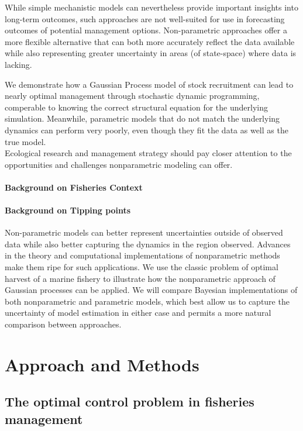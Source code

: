 \documentclass[author-year, review]{elsarticle} %
\begin{document}
While simple mechanistic models can nevertheless provide important
insights into long-term outcomes, such approaches are not well-suited
for use in forecasting outcomes of potential management options.
Non-parametric approaches offer a more flexible alternative that can
both more accurately reflect the data available while also representing
greater uncertainty in areas (of state-space) where data is lacking.

We demonstrate how a Gaussian Process model of stock recruitment can
lead to nearly optimal management through stochastic dynamic
programming, comperable to knowing the correct structural equation for
the underlying simulation. Meanwhile, parametric models that do not
match the underlying dynamics can perform very poorly, even though they
fit the data as well as the true model.\\Ecological research and
management strategy should pay closer attention to the opportunities and
challenges nonparametric modeling can offer.

\paragraph{Background on Fisheries Context}

\paragraph{Background on Tipping points}

Non-parametric models can better represent uncertainties outside of
observed data while also better capturing the dynamics in the region
observed. Advances in the theory and computational implementations of
nonparametric methods make them ripe for such applications. We use the
classic problem of optimal harvest of a marine fishery to illustrate how
the nonparametric approach of Gaussian processes can be applied. We will
compare Bayesian implementations of both nonparametric and parametric
models, which best allow us to capture the uncertainty of model
estimation in either case and permits a more natural comparison between
approaches.

\section{Approach and Methods}

\subsection{The optimal control problem in fisheries management}
\end{document}
